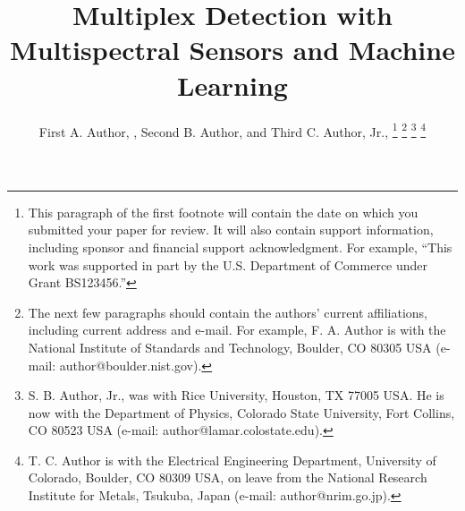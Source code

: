 \documentclass[journal,twoside,web]{ieeecolor}
\begin{document}
\title{Multiplex Detection with Multispectral Sensors and Machine Learning }
\author{First A. Author, , Second B. Author, and Third C. Author, Jr., 
\thanks{This paragraph of the first footnote will contain the date on 
which you submitted your paper for review. It will also contain support 
information, including sponsor and financial support acknowledgment. For 
example, ``This work was supported in part by the U.S. Department of 
Commerce under Grant BS123456.'' }
\thanks{The next few paragraphs should contain 
the authors' current affiliations, including current address and e-mail. For 
example, F. A. Author is with the National Institute of Standards and 
Technology, Boulder, CO 80305 USA (e-mail: author@boulder.nist.gov). }
\thanks{S. B. Author, Jr., was with Rice University, Houston, TX 77005 USA. He is 
now with the Department of Physics, Colorado State University, Fort Collins, 
CO 80523 USA (e-mail: author@lamar.colostate.edu).}
\thanks{T. C. Author is with 
the Electrical Engineering Department, University of Colorado, Boulder, CO 
80309 USA, on leave from the National Research Institute for Metals, 
Tsukuba, Japan (e-mail: author@nrim.go.jp).}}
\end{document}

